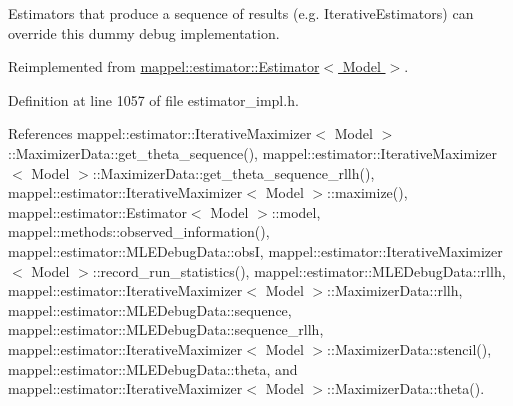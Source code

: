 Estimators that produce a sequence of results (e.\+g. Iterative\+Estimators) can override this dummy debug implementation. 

Reimplemented from \hyperlink{classmappel_1_1estimator_1_1Estimator_a59710205cc6b04fe84b171d9bc4b5d1c}{mappel\+::estimator\+::\+Estimator$<$ Model $>$}.



Definition at line 1057 of file estimator\+\_\+impl.\+h.



References mappel\+::estimator\+::\+Iterative\+Maximizer$<$ Model $>$\+::\+Maximizer\+Data\+::get\+\_\+theta\+\_\+sequence(), mappel\+::estimator\+::\+Iterative\+Maximizer$<$ Model $>$\+::\+Maximizer\+Data\+::get\+\_\+theta\+\_\+sequence\+\_\+rllh(), mappel\+::estimator\+::\+Iterative\+Maximizer$<$ Model $>$\+::maximize(), mappel\+::estimator\+::\+Estimator$<$ Model $>$\+::model, mappel\+::methods\+::observed\+\_\+information(), mappel\+::estimator\+::\+M\+L\+E\+Debug\+Data\+::obsI, mappel\+::estimator\+::\+Iterative\+Maximizer$<$ Model $>$\+::record\+\_\+run\+\_\+statistics(), mappel\+::estimator\+::\+M\+L\+E\+Debug\+Data\+::rllh, mappel\+::estimator\+::\+Iterative\+Maximizer$<$ Model $>$\+::\+Maximizer\+Data\+::rllh, mappel\+::estimator\+::\+M\+L\+E\+Debug\+Data\+::sequence, mappel\+::estimator\+::\+M\+L\+E\+Debug\+Data\+::sequence\+\_\+rllh, mappel\+::estimator\+::\+Iterative\+Maximizer$<$ Model $>$\+::\+Maximizer\+Data\+::stencil(), mappel\+::estimator\+::\+M\+L\+E\+Debug\+Data\+::theta, and mappel\+::estimator\+::\+Iterative\+Maximizer$<$ Model $>$\+::\+Maximizer\+Data\+::theta().

